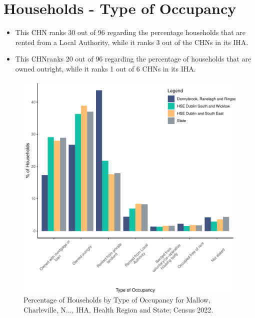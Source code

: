 \documentclass{article}
\begin{document}
\section{Households - Type of Occupancy}\label{sect:Households}
\begin{itemize}
\item This CHN ranks  30 out of 96 regarding the percentage households that are rented from a Local Authority, while it ranks  3 out of the CHNs in its IHA. 
\item This CHNranks  20 out of 96 regarding the percentage of households that are owned outright, while it ranks   1 out of 6 CHNs in its IHA.
\end{itemize}
\begin{figure}[H]
	\centering
	\includegraphics[width = 140mm]{../figures/HouseholdsED.pdf}
	\caption{Percentage of Households by Type of Occupancy for Mallow, Charleville, N..., IHA, Health Region and State; Census 2022.}
	\label{fig:vbnv}
	\end{figure}
\end{document}
